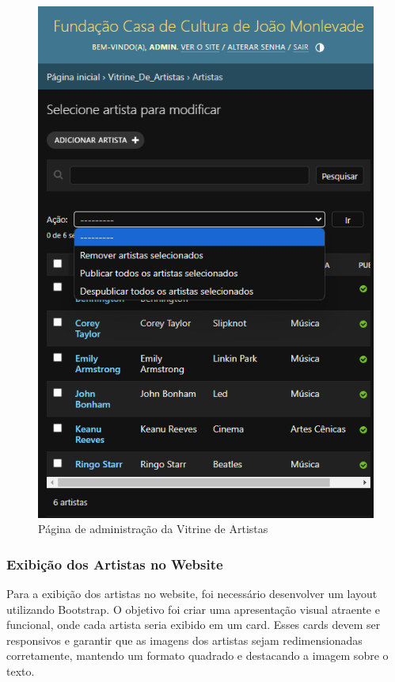 \begin{figure}[htb]
	\caption{\label{fig_adm_vitrine}Página de administração da Vitrine de Artistas}
	\begin{center}
	    \includegraphics[scale=0.45]{./img/admin_artista.png}
	\end{center}
\end{figure}

\subsubsection{Exibição dos Artistas no Website}

Para a exibição dos artistas no website, foi necessário desenvolver um layout utilizando Bootstrap. O objetivo foi criar uma apresentação visual atraente e funcional, onde cada artista seria exibido em um card. Esses cards devem ser responsivos e garantir que as imagens dos artistas sejam redimensionadas corretamente, mantendo um formato quadrado e destacando a imagem sobre o texto.


